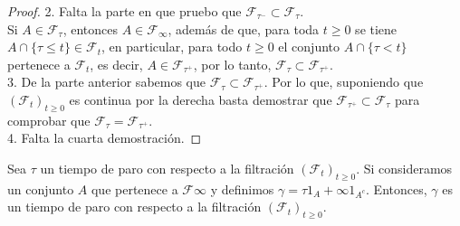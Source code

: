 \begin{proof}
2. Falta la parte en que pruebo que $\mathcal{F}_{\tau^{-}} \subset \mathcal{F}_{\tau}$. \\

Si $A \in \mathcal{F}_{\tau}$, entonces $A \in \mathcal{F}_{\infty}$, además de que, para toda $t \geq 0$ se tiene $A \cap \{ \tau \leq t \} \in \mathcal{F}_t$, en particular, para todo $t \geq 0$ el conjunto $A \cap \{ \tau < t \}$ pertenece a $\mathcal{F}_t$, es decir, $A \in \mathcal{F}_{\tau^{+}}$, por lo tanto, $\mathcal{F}_{\tau} \subset \mathcal{F}_{\tau^{+}}$. \\

3. De la parte anterior sabemos que $\mathcal{F}_{\tau} \subset \mathcal{F}_{\tau^{+}}$. Por lo que, suponiendo que $(\mathcal{F}_t)_{t \geq 0}$ es continua por la derecha basta demostrar que $\mathcal{F}_{\tau^{+}} \subset \mathcal{F}_{\tau}$ para comprobar que $\mathcal{F}_{\tau} = \mathcal{F}_{\tau^{+}}$. \\

4. Falta la cuarta demostración.
\end{proof}

\begin{proposition}
	Sea $\tau$ un tiempo de paro con respecto a la filtración $(\mathcal{F}_t)_{t \geq 0}$. Si consideramos un conjunto $A$ que pertenece a $\mathcal{F}{\infty}$ y definimos $\gamma = \tau 1_A + \infty 1_{A^{c}}$. Entonces, $\gamma$ es un tiempo de paro con respecto a la filtración $(\mathcal{F}_t)_{t \geq 0}$.
\end{proposition}

